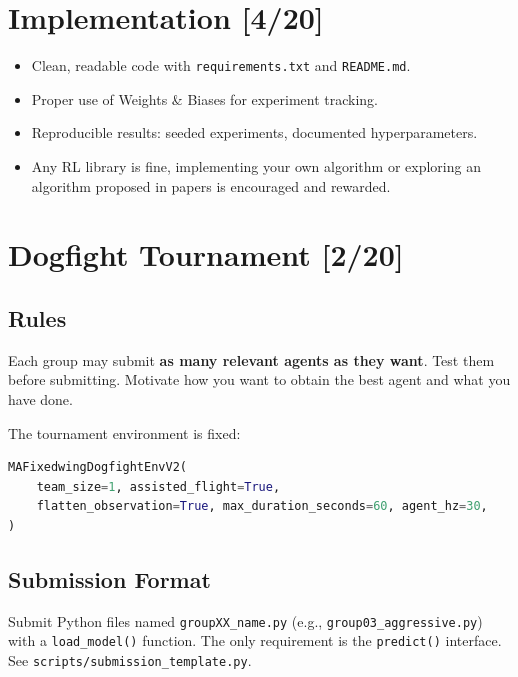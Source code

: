 \documentclass[11pt,a4paper]{article}
\newcommand{\pts}[1]{\hfill{\normalfont\normalsize\color{pts} [#1/20]}}
\begin{document}
\section{Implementation\pts{4}}
\label{sec:implementation}

\begin{itemize}[nosep]
  \item Clean, readable code with \texttt{requirements.txt} and \texttt{README.md}.
  \item Proper use of Weights \& Biases for experiment tracking.
  \item Reproducible results: seeded experiments, documented hyperparameters.
  \item Any RL library is fine, implementing your own algorithm or exploring an algorithm proposed in papers is encouraged and rewarded.
\end{itemize}

\section{Dogfight Tournament\pts{2}}
\label{sec:tournament}

\subsection{Rules}

Each group may submit \textbf{as many relevant agents as they want}. Test them before submitting. Motivate how you want to obtain the best agent and what you have done.

The tournament environment is fixed:
\begin{lstlisting}[language=Python, numbers=none]
MAFixedwingDogfightEnvV2(
    team_size=1, assisted_flight=True,
    flatten_observation=True, max_duration_seconds=60, agent_hz=30,
)
\end{lstlisting}

\subsection{Submission Format}

Submit Python files named \texttt{groupXX\_name.py} (e.g., \texttt{group03\_aggressive.py}) with a \texttt{load\_model()} function. The only requirement is the \texttt{predict()} interface. See \texttt{scripts/submission\_template.py}.
\end{document}
